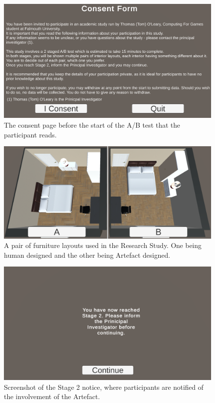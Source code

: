 \begin{figure}[!ht]
    \includegraphics[width=\columnwidth]{./Images/consent-form.png}
    \centering
    \caption{The consent page before the start of the A/B test that the participant reads.}
    \label{consent-screen}
\end{figure}
\begin{figure}[!ht]
    \includegraphics[width=\columnwidth]{./Images/pair-3.png}
    \centering
    \caption{A pair of furniture layouts used in the Research Study. One being human designed and the other being Artefact designed.}
    \label{pair-example-1}
\end{figure}
\begin{figure}[!ht]
    \includegraphics[width=\columnwidth]{./Images/stage-2-notice.png}
    \centering
    \caption{Screenshot of the Stage 2 notice, where participants are notified of the involvement of the Artefact.}
    \label{stage-2}
\end{figure}


